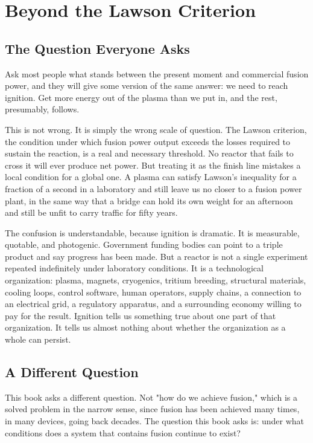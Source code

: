 \chapter{Beyond the Lawson Criterion}

\section{The Question Everyone Asks}

Ask most people what stands between the present moment and commercial fusion power, and they will give some version of the same answer: we need to reach ignition. Get more energy out of the plasma than we put in, and the rest, presumably, follows.

This is not wrong. It is simply the wrong scale of question. The Lawson criterion, the condition under which fusion power output exceeds the losses required to sustain the reaction, is a real and necessary threshold. No reactor that fails to cross it will ever produce net power. But treating it as the finish line mistakes a local condition for a global one. A plasma can satisfy Lawson's inequality for a fraction of a second in a laboratory and still leave us no closer to a fusion power plant, in the same way that a bridge can hold its own weight for an afternoon and still be unfit to carry traffic for fifty years.

The confusion is understandable, because ignition is dramatic. It is measurable, quotable, and photogenic. Government funding bodies can point to a triple product and say progress has been made. But a reactor is not a single experiment repeated indefinitely under laboratory conditions. It is a technological organization: plasma, magnets, cryogenics, tritium breeding, structural materials, cooling loops, control software, human operators, supply chains, a connection to an electrical grid, a regulatory apparatus, and a surrounding economy willing to pay for the result. Ignition tells us something true about one part of that organization. It tells us almost nothing about whether the organization as a whole can persist.

\section{A Different Question}

This book asks a different question. Not "how do we achieve fusion," which is a solved problem in the narrow sense, since fusion has been achieved many times, in many devices, going back decades. The question this book asks is: under what conditions does a system that contains fusion continue to exist?

